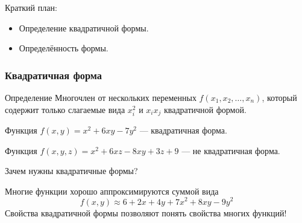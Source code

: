 
\begin{frame} %


\end{frame}



\begin{frame}{Краткий план:}
  \begin{itemize}[<+->]
    \item Определение квадратичной формы.
    \item Определённость формы.
  \end{itemize}

\end{frame}



\begin{frame}
    \frametitle{Квадратичная форма}    

    \begin{block}{Определение}
       Многочлен от нескольких переменных $f(x_1, x_2, \ldots, x_n)$, который содержит только слагаемые вида $x_i^2$ и $x_i x_j$ 
       \alert{квадратичной формой}.
    \end{block}

    \pause
    Функция $f(x,y) = x^2 + 6xy - 7y^2$ — квадратичная форма.

    \pause
    Функция $f(x, y, z) = x^2 + 6xz - 8xy + 3z + 9$ — не квадратичная форма. 
\end{frame}


\begin{frame}{Зачем нужны квадратичные формы?}
    
    Многие функции хорошо аппроксимируются суммой вида
    \[
    f(x, y) \approx 6 + 2x + 4y + 7x^2 + 8xy - 9y^2
    \]
    \pause
    Свойства квадратичной формы позволяют понять свойства многих функций!
    
\end{frame}


